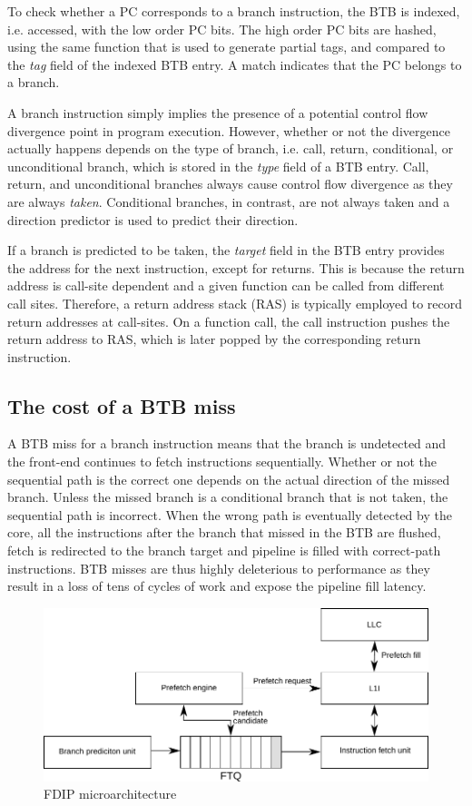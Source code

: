 To check whether a PC corresponds to a branch instruction, the BTB is indexed, i.e. accessed, with the low order PC bits. The high order PC bits are hashed, using the same function that is used to generate partial tags, and compared to the \textit{tag} field of the indexed BTB entry. A match indicates that the PC belongs to a branch. 

A branch instruction simply implies the presence of a potential control flow divergence point in program execution. However, whether or not the divergence actually happens depends on the type of branch, i.e. call, return, conditional, or unconditional branch, which is stored in the \textit{type} field of a BTB entry. Call, return, and unconditional branches always cause control flow divergence as they are always \textit{taken}. Conditional branches, in contrast, are not always taken and a direction predictor is used to predict their direction. 

If a branch is predicted to be taken, the \textit{target} field in the BTB entry provides the address for the next instruction, except for returns. This is because the return address is call-site dependent and a given function can be called from different call sites. Therefore, a return address stack (RAS) is typically employed to record return addresses at call-sites. On a function call, the call instruction pushes the return address to RAS, which is later popped by the corresponding return instruction.

\subsection{The cost of a BTB miss}
A BTB miss for a branch instruction means that the branch is undetected and the front-end continues to fetch instructions sequentially. Whether or not the sequential path is the correct one depends on the actual direction of the missed branch. Unless the missed branch is a conditional branch that is not taken, the sequential path is incorrect. When the wrong path is eventually detected by the core, all the instructions after the branch that missed in the BTB are flushed, fetch is redirected to the branch target and pipeline is filled with correct-path instructions. BTB misses are thus highly deleterious to performance as they result in a loss of tens of cycles of work and expose the pipeline fill latency. 

\begin{figure}
\centering
\includegraphics[width=.9\columnwidth, trim=0 0 0 0, clip]{figures/fdip1.pdf}
\caption{FDIP microarchitecture}
\label{hpca:fig:fdip}
\end{figure}



